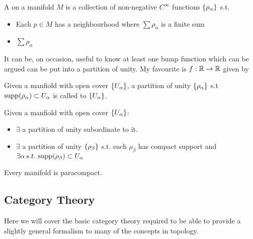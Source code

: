 \documentclass{article}
\begin{document}
\begin{definition}
	A  on a manifold $M$ is a collection of non-negative $C^\infty$ functions $\left\{ \rho_\alpha \right\}$ s.t. 
	\begin{itemize}
		\item Each $p \in M$ has a neighbourhood where $\sum \rho_\alpha$ is a finite sum
		\item $\sum \rho_\alpha$
	\end{itemize}
\end{definition}

\begin{remark}
	It can be, on occasion, useful to know at least one bump function which can be argued can be put into a partition of unity. My favourite is $f: \mathbb{R} \to \mathbb{R}$ given by  
\end{remark}

\begin{definition}
	Given a manfiold with open cover $\left\{ U_\alpha \right\}$, a partition of unity $\left\{ \rho_\alpha \right\}$ s.t $\operatorname{supp}(\rho_\alpha) \subset U_\alpha$ is called  to $\left\{ U_\alpha \right\}$. 
\end{definition}

\begin{prop}
	Given a manfiold with open cover $\left\{ U_\alpha \right\}$:
	\begin{itemize}
		\item $\exists$ a partition of unity subordinate to it.
		\item $\exists$ a partition of unity $\left\{ \rho_\beta \right\}$ s.t. each $\rho_\beta$ has compact support and $\exists \alpha \, s.t. \, \operatorname{supp}(\rho_\beta) \subset U_\alpha$ 
	\end{itemize}
\end{prop}

\begin{prop}
	Every manifold is paracompact.
\end{prop}

\subsection{Category Theory}
Here we will cover the basic category theory required to be able to provide a slightly general formalism to many of the concepts in topology. 
\end{document}
